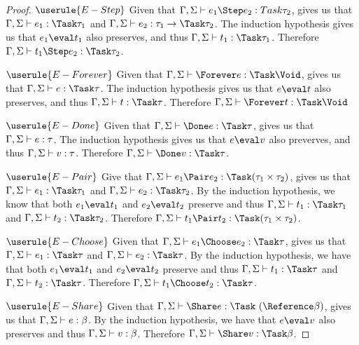 \begin{proof}
  \case
     {$\userule{E-Step}$}{}
     {Given that $\Gamma,\Sigma\infers e_1\Step e_2:Task\tau_2$,  gives us that $\Gamma,\Sigma\infers e_1:\Task\tau_1$ and $\Gamma,\Sigma\infers e_2:\tau_1\to\Task \tau_2$.
     The induction hypothesis gives us that $e_1\eval t_1$ also preserves, and thus $\Gamma,\Sigma\infers t_1:\Task\tau_1$.
     Therefore $\Gamma,\Sigma\infers t_1\Step e_2:\Task\tau_2$.}

  \case
    {$\userule{E-Forever}$}
    {Given that $\Gamma,\Sigma\infers \Forever e : \Task \Void$,  gives us that $\Gamma,\Sigma\infers e:\Task \tau$.
    The induction hypothesis gives us that $e\eval t$ also preserves, and thus $\Gamma,\Sigma\infers t:\Task \tau$.
    Therefore $\Gamma,\Sigma\infers \Forever t : \Task \Void$}

  \case
    {$\userule{E-Done}$}
    {Given that $\Gamma,\Sigma\infers\Done e :\Task\tau$,  gives us that $\Gamma,\Sigma \vdash e:\tau$.
    The induction hypothesis gives us that $e\eval v$ also preverves, and thus $\Gamma,\Sigma\vdash v:\tau$.
    Therefore $\Gamma,\Sigma\infers \Done v : \Task \tau$.}

  \case
    {$\userule{E-Pair}$}
    {Give that $\Gamma,\Sigma\infers e_1\Pair e_2:\Task(\tau_1\times\tau_2)$,  gives us that $\Gamma,\Sigma\infers e_1:\Task\tau_1$ and $\Gamma,\Sigma\infers e_2:\Task\tau_2$.
    By the induction hypothesis, we know that both $e_1\eval t_1$ and $e_2\eval t_2$ preserve and thus $\Gamma,\Sigma\infers t_1:\Task\tau_1$ and $\Gamma,\Sigma\infers t_2:\Task\tau_2$.
    Therefore $\Gamma,\Sigma\infers t_1\Pair t_2:\Task(\tau_1\times\tau_2)$.}


  \case
     {$\userule{E-Choose}$}
     {Given that $\Gamma,\Sigma\infers e_1\Choose e_2:\Task\tau$,  gives us that $\Gamma,\Sigma\infers e_1:\Task\tau$ and $\Gamma,\Sigma\infers e_2:\Task\tau$.
     By the induction hypothesis, we have that both $e_1\eval t_1$ and $e_2\eval t_2$ preserve and thus $\Gamma,\Sigma\infers t_1:\Task\tau$ and $\Gamma,\Sigma\infers t_2:\Task\tau$.
     Therefore $\Gamma,\Sigma\infers t_1\Choose t_2:\Task\tau$.}

  \case
    {$\userule{E-Share}$}
    {Given that $\Gamma,\Sigma\infers \Share e : \Task\ (\Reference \beta)$,  gives us that $\Gamma,\Sigma\vdash e:\beta$.
    By the induction hypothesis, we have that $e\eval v$ also preserves and thus $\Gamma,\Sigma\vdash v:\beta$.
    Therefore $\Gamma,\Sigma\infers \Share v:\Task \beta$.}


\end{proof}
